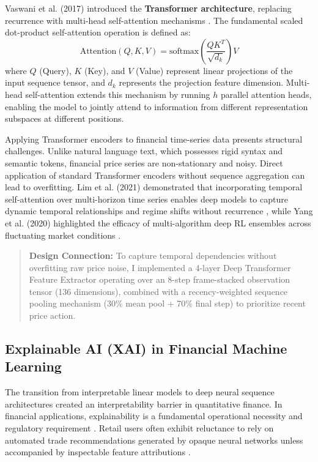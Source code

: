 \documentclass[11pt,a4paper]{article}
\newenvironment{callout}{%
  \par\vspace{8pt}
  \noindent\makebox[\linewidth]{\rule{\linewidth}{0.6pt}}\vspace{-4pt}
  \begin{quote}\small
}{%
  \end{quote}\vspace{-6pt}
  \noindent\makebox[\linewidth]{\rule{\linewidth}{0.6pt}}\vspace{8pt}
}
\begin{document}
Vaswani et al. (2017) introduced the \textbf{Transformer architecture}, replacing recurrence with multi-head self-attention mechanisms \cite{vaswani2017}. The fundamental scaled dot-product self-attention operation is defined as:
\begin{equation}
\text{Attention}(Q, K, V) = \text{softmax}\left(\frac{QK^T}{\sqrt{d_k}}\right)V
\end{equation}
where $Q$ (Query), $K$ (Key), and $V$ (Value) represent linear projections of the input sequence tensor, and $d_k$ represents the projection feature dimension. Multi-head self-attention extends this mechanism by running $h$ parallel attention heads, enabling the model to jointly attend to information from different representation subspaces at different positions.

Applying Transformer encoders to financial time-series data presents structural challenges. Unlike natural language text, which possesses rigid syntax and semantic tokens, financial price series are non-stationary and noisy. Direct application of standard Transformer encoders without sequence aggregation can lead to overfitting. Lim et al. (2021) demonstrated that incorporating temporal self-attention over multi-horizon time series enables deep models to capture dynamic temporal relationships and regime shifts without recurrence \cite{lim2021}, while Yang et al. (2020) highlighted the efficacy of multi-algorithm deep RL ensembles across fluctuating market conditions \cite{yang2020}.

\begin{callout}
\textbf{Design Connection:} To capture temporal dependencies without overfitting raw price noise, I implemented a 4-layer Deep Transformer Feature Extractor operating over an 8-step frame-stacked observation tensor (136 dimensions), combined with a recency-weighted sequence pooling mechanism (30\% mean pool + 70\% final step) to prioritize recent price action.
\end{callout}

\subsection{Explainable AI (XAI) in Financial Machine Learning}
The transition from interpretable linear models to deep neural sequence architectures created an interpretability barrier in quantitative finance. In financial applications, explainability is a fundamental operational necessity and regulatory requirement \cite{arrieta2020}. Retail users often exhibit reluctance to rely on automated trade recommendations generated by opaque neural networks unless accompanied by inspectable feature attributions \cite{arrieta2020}.
\end{document}
